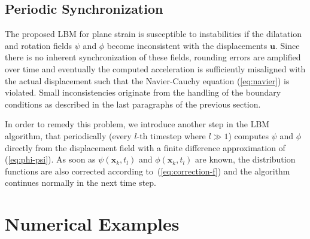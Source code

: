 \documentclass{article}
\renewcommand{\vec}{\boldsymbol}        %
\begin{document}



\subsection{Periodic Synchronization}
\label{sec:synchronization}

The proposed LBM for plane strain is  susceptible to instabilities if the dilatation and rotation fields $\psi$ and $\phi$ become inconsistent with the displacements $\boldsymbol{u}$. Since there is no inherent synchronization of these fields, rounding errors are amplified over time and eventually the computed acceleration is sufficiently misaligned with the actual displacement such that the Navier-Cauchy equation (\ref{eq:navier}) is violated. Small inconsistencies originate from the handling of the boundary conditions as described in the last paragraphs of the previous section. 

In order to remedy this problem, we introduce another step in the LBM algorithm, that periodically (every $l$-th timestep where $l\gg{1}$) computes $\psi$ and $\phi$ directly from the displacement field with a finite difference approximation of  (\ref{eq:phi-psi}). As soon as $\psi(\vec{x}_k,t_l)$ and $\phi(\vec{x}_k,t_l)$ are known,
the distribution functions are also corrected according to~(\ref{eq:correction-f}) and the algorithm continues normally in the next time step.

\section{Numerical Examples}
\end{document}
